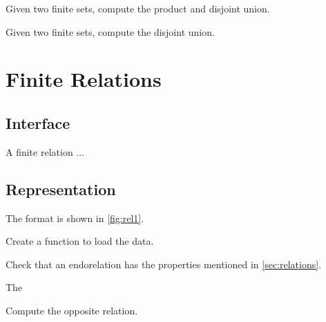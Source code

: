 \begin{gradedexercise}
Given two finite sets, compute the product and disjoint union.

\end{gradedexercise}
\begin{gradedexercise}
Given two finite sets, compute the disjoint union.

\end{gradedexercise}


\section{Finite Relations}

\subsection*{Interface}

A finite relation  ...


\subsection*{Representation}

The format is shown in \cref{fig:rel1}.


\begin{gradedexercise}
Create a function to load the data.


%

\end{gradedexercise}


%  

\begin{gradedexercise}

Check that an endorelation has the properties mentioned in \cref{sec:relations}.

The

\end{gradedexercise}




\begin{gradedexercise}[Opposite]
Compute the opposite relation.


\end{gradedexercise}

